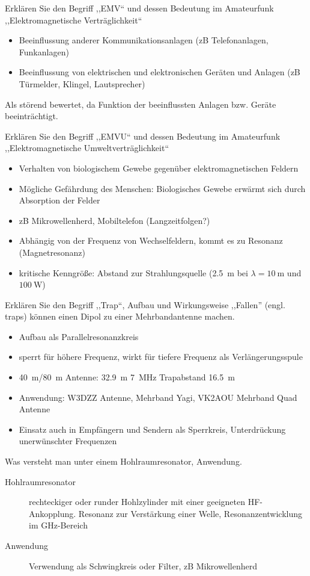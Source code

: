 \documentclass[avery5371,grid,frame,a4paper]{flashcards}
\newcommand{\card}[3]{
  \begin{flashcard}[{\chap} -- #1]{#2}#3\end{flashcard}
}
\begin{document}
\card{87}{Erklären Sie den Begriff ,,EMV`` und dessen Bedeutung im Amateurfunk}{
  ,,Elektromagnetische Verträglichkeit``

  \begin{itemize}
    \item Beeinflussung anderer Kommunikationsanlagen (zB Telefonanlagen, Funkanlagen)
    \item Beeinflussung von elektrischen und elektronischen Geräten und Anlagen (zB Türmelder, Klingel, Lautsprecher)
  \end{itemize}
  Als störend bewertet, da Funktion der beeinflussten Anlagen bzw. Geräte beeinträchtigt.
}
\card{88}{Erklären Sie den Begriff ,,EMVU`` und dessen Bedeutung im Amateurfunk}{
  \small
  ,,Elektromagnetische Umweltverträglichkeit``

  \begin{itemize}\itemsep0pt
    \item Verhalten von biologischem Gewebe gegenüber elektromagnetischen Feldern
    \item Mögliche Gefährdung des Menschen: Biologisches Gewebe erwärmt sich durch Absorption der Felder
    \item zB Mikrowellenherd, Mobiltelefon (Langzeitfolgen?)
    \item Abhängig von der Frequenz von Wechselfeldern, kommt es zu Resonanz (Magnetresonanz)
    \item kritische Kenngröße: Abstand zur Strahlungsquelle (\SI{2,5}{\metre} bei $\lambda = \SI{10}{\metre}$ und $\SI{100}{\watt}$)
  \end{itemize}
}
\card{89}{Erklären Sie den Begriff ,,Trap``, Aufbau und Wirkungsweise}{
  \small
  ,,Fallen'' (engl. traps) können einen Dipol zu einer Mehrbandantenne machen.
  \begin{itemize}\itemsep0pt
    \item Aufbau als Parallelresonanzkreis
    \item sperrt für höhere Frequenz, wirkt für tiefere Frequenz als Verlängerungsspule
    \item {\footnotesize \SI{40}{\metre}/\SI{80}{\metre} Antenne: \SI{32,9}{\metre} \SI{7}{\mega\Hz} Trapabstand \SI{16,5}{\metre}}
    \item Anwendung: W3DZZ Antenne, Mehrband Yagi, VK2AOU Mehrband Quad Antenne
    \item Einsatz auch in Empfängern und Sendern als Sperrkreis, Unterdrückung unerwünschter Frequenzen
  \end{itemize}
}
\card{90}{Was versteht man unter einem Hohlraumresonator, Anwendung.}{
  \begin{description}
    \item[Hohlraumresonator]
      rechteckiger oder runder Hohlzylinder mit einer geeigneten HF-Ankopplung.
      Resonanz zur Verstärkung einer Welle,
      Resonanzentwicklung im GHz-Bereich
    \item[Anwendung]
      Verwendung als Schwingkreis oder Filter, zB Mikrowellenherd
  \end{description}
}
\end{document}
